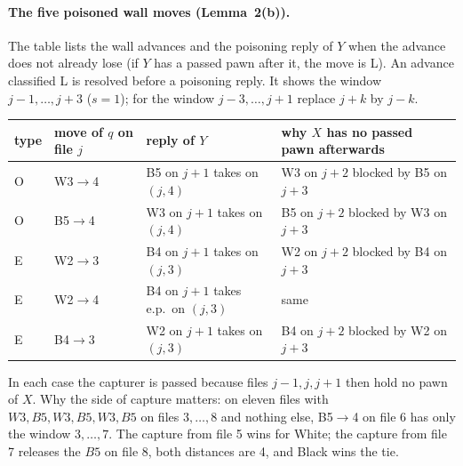 \paragraph{The five poisoned wall moves (Lemma~2(b)).}
The table lists the wall advances and the poisoning reply of $Y$ when the advance does not already lose (if $Y$ has a passed pawn after
it, the move is L). An advance classified L is resolved before a poisoning reply. It shows the window $j-1,\dots,j+3$ ($s=1$); for the window $j-3,\dots,j+1$ replace $j+k$ by $j-k$.
\begin{center}\small
\begin{tabular}{llll}
type & move of $q$ on file $j$ & reply of $Y$ & why $X$ has no passed pawn afterwards\\\hline
O & W3$\to$4 & B5 on $j{+}1$ takes on $(j,4)$ & W3 on $j{+}2$ blocked by B5 on $j{+}3$\\
O & B5$\to$4 & W3 on $j{+}1$ takes on $(j,4)$ & B5 on $j{+}2$ blocked by W3 on $j{+}3$\\
E & W2$\to$3 & B4 on $j{+}1$ takes on $(j,3)$ & W2 on $j{+}2$ blocked by B4 on $j{+}3$\\
E & W2$\to$4 & B4 on $j{+}1$ takes e.p.\ on $(j,3)$ & same\\
E & B4$\to$3 & W2 on $j{+}1$ takes on $(j,3)$ & B4 on $j{+}2$ blocked by W2 on $j{+}3$\\
\end{tabular}
\end{center}
In each case the capturer is passed because files $j-1,j,j+1$ then hold no pawn of $X$. Why the side of capture matters: on eleven files with
$W3,B5,W3,B5,W3,B5$ on files $3,\dots,8$ and nothing else, B5$\to$4 on file 6 has only the window $3,\dots,7$. The capture from file 5
wins for White; the capture from file 7 releases the $B5$ on file 8, both distances are 4, and Black wins the tie.

